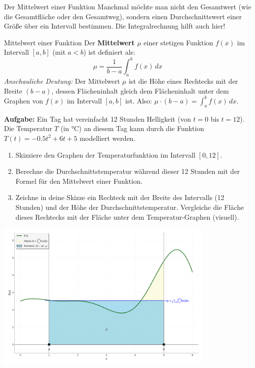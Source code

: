\begin{aufgabenumgebung}{Der Mittelwert einer Funktion}
Manchmal möchte man nicht den Gesamtwert (wie die Gesamtfläche oder den Gesamtweg), sondern einen Durchschnittswert einer Größe über ein Intervall bestimmen. Die Integralrechnung hilft auch hier!

\begin{merksatzumgebung}{Mittelwert einer Funktion}
Der \textbf{Mittelwert $\mu$} einer stetigen Funktion $f(x)$ im Intervall $[a,b]$ (mit $a<b$) ist definiert als:
\[ \mu = \frac{1}{b-a} \int_a^b f(x) \,dx \]
\textit{Anschauliche Deutung:} Der Mittelwert $\mu$ ist die Höhe eines Rechtecks mit der Breite $(b-a)$, dessen Flächeninhalt gleich dem Flächeninhalt unter dem Graphen von $f(x)$ im Intervall $[a,b]$ ist. Also: $\mu \cdot (b-a) = \int_a^b f(x) \,dx$.
\end{merksatzumgebung}

\textbf{Aufgabe:}
Ein Tag hat vereinfacht 12 Stunden Helligkeit (von $t=0$ bis $t=12$). Die Temperatur $T$ (in °C) an diesem Tag kann durch die Funktion $T(t) = -0.5t^2 + 6t + 5$ modelliert werden.
\begin{enumerate}
    \item Skizziere den Graphen der Temperaturfunktion im Intervall $[0,12]$.
    \item Berechne die Durchschnittstemperatur während dieser 12 Stunden mit der Formel für den Mittelwert einer Funktion.
    \item Zeichne in deine Skizze ein Rechteck mit der Breite des Intervalls (12 Stunden) und der Höhe der Durchschnittstemperatur. Vergleiche die Fläche dieses Rechtecks mit der Fläche unter dem Temperatur-Graphen (visuell).
\end{enumerate}
\begin{center}
    \includegraphics[width=0.8\textwidth]{grafiken/Integral_Mittelwert_Funktion.png}
    \label{fig:mittelwert_funktion}
\end{center}
\end{aufgabenumgebung}


